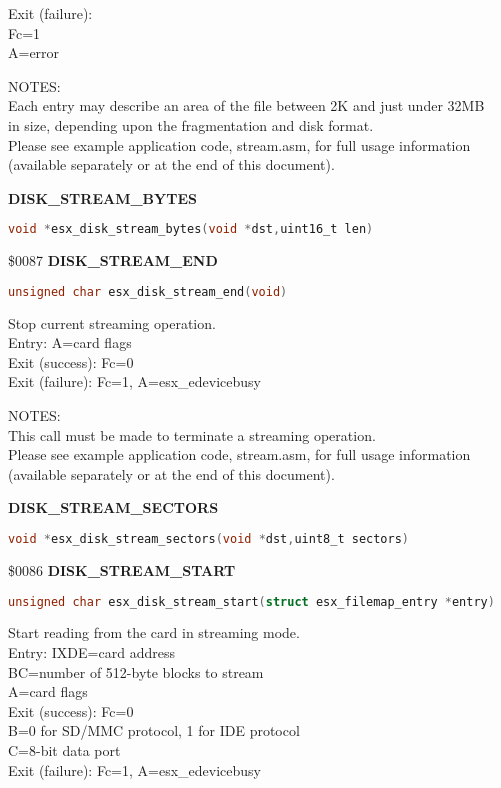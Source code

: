 Exit (failure):\\
Fc=1\\
A=error

NOTES:\\
Each entry may describe an area of the file between 2K and just under 32MB\\
in size, depending upon the fragmentation and disk format.\\
Please see example application code, stream.asm, for full usage information\\
(available separately or at the end of this document).

\textbf{DISK\_STREAM\_BYTES}

\begin{lstlisting}[language=C]
void *esx_disk_stream_bytes(void *dst,uint16_t len)
\end{lstlisting}

\$0087 \textbf{DISK\_STREAM\_END}

\begin{lstlisting}[language=C]
unsigned char esx_disk_stream_end(void)
\end{lstlisting}

Stop current streaming operation.\\
Entry: A=card flags\\
Exit (success): Fc=0\\
Exit (failure): Fc=1, A=esx\_edevicebusy

NOTES:\\
This call must be made to terminate a streaming operation.\\
Please see example application code, stream.asm, for full usage information\\
(available separately or at the end of this document).

\textbf{DISK\_STREAM\_SECTORS}

\begin{lstlisting}[language=C]
void *esx_disk_stream_sectors(void *dst,uint8_t sectors)
\end{lstlisting}

\$0086 \textbf{DISK\_STREAM\_START}

\begin{lstlisting}[language=C]
unsigned char esx_disk_stream_start(struct esx_filemap_entry *entry)
\end{lstlisting}

Start reading from the card in streaming mode.\\
Entry: IXDE=card address\\
BC=number of 512-byte blocks to stream\\
A=card flags\\
Exit (success): Fc=0\\
B=0 for SD/MMC protocol, 1 for IDE protocol\\
C=8-bit data port\\
Exit (failure): Fc=1, A=esx\_edevicebusy

